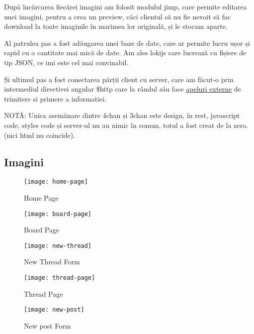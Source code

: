 După încărcarea fiecărei imagini am folosit modulul jimp\cite{jimp}, care permite editarea unei imagini, pentru a crea un preview, căci clientul să nu fie nevoit să fac download la toate imaginile în marimea lor originală, și le stocam aparte.

Al patrulea pas a fost adăugarea unei baze de date, care ar permite lucru ușor și rapid cu o cantitate mai mică de date. Am ales lokijs\cite{lokijs} care lucrează cu fișiere de tip JSON, ce imi este cel mai convinabil.

Și ultimul pas a fost conectarea părții client cu server, care am făcut-o prin intermediul directivei angular \$http\cite{angular-http} care la rândul său face \href{https://github.com/AScripnic/MIDPS-laboratories/blob/master/Lab%233/website/app/services/threadService.js}{apeluri externe} de trimitere si primere a informatiei.

NOTĂ: Unica asemănare dintre 4chan și 3chan este design, în rest, javascript code, styles code și server-ul nu au nimic în comun, totul a fost creat de la zero. (nici html nu coincide).

\subsection{Imagini}
\begin{center}
	\begin{figure}[h]
		\texttt{[image: home-page]}\\
		\caption{Home Page}
		\label{home-page}
	\end{figure}
	
	
	\begin{figure}[h]
		\texttt{[image: board-page]}\\
		\caption{Board Page}
		\label{board-page}
	\end{figure}
	
	
	\begin{figure}[h]
		\texttt{[image: new-thread]}\\
		\caption{New Thread Form}
		\label{new-thread}
	\end{figure}
	
	
	\begin{figure}[h]
		\texttt{[image: thread-page]}\\
		\caption{Thread Page}
		\label{thread-page}
	\end{figure}
	
	
	\begin{figure}[h]
		\texttt{[image: new-post]}\\
		\caption{New post Form}
		\label{new-post}
	\end{figure}
\end{center}

\clearpage